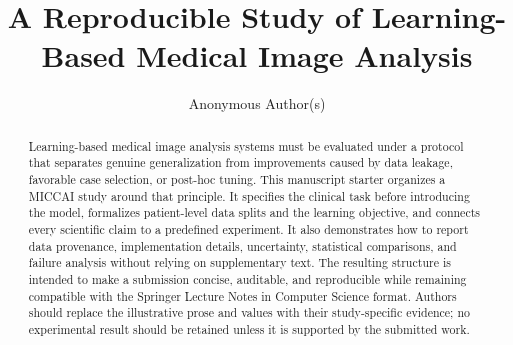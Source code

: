 \documentclass[runningheads]{llncs}
\begin{document}
\title{A Reproducible Study of Learning-Based Medical Image Analysis}

\author{Anonymous Author(s)}

\maketitle

\noindent{}
\vspace{0.8em}



\begin{abstract}
Learning-based medical image analysis systems must be evaluated under a
protocol that separates genuine generalization from improvements caused by
data leakage, favorable case selection, or post-hoc tuning.  This manuscript
starter organizes a MICCAI study around that principle.  It specifies the
clinical task before introducing the model, formalizes patient-level data
splits and the learning objective, and connects every scientific claim to a
predefined experiment.  It also demonstrates how to report data provenance,
implementation details, uncertainty, statistical comparisons, and failure
analysis without relying on supplementary text.  The resulting structure is
intended to make a submission concise, auditable, and reproducible while
remaining compatible with the Springer Lecture Notes in Computer Science
format.  Authors should replace the illustrative prose and values with their
study-specific evidence; no experimental result should be retained unless it
is supported by the submitted work.

\end{abstract}







\end{document}
